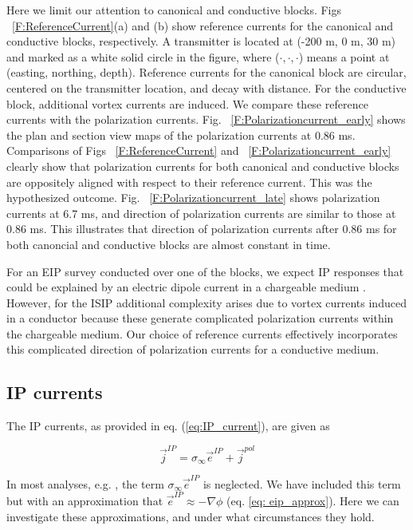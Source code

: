 \documentclass[extra,mreferee]{gji}
\newcommand{\siginf}{\sigma_\infty}
\renewcommand {\j}  { {\vec j} }
\newcommand {\e}  { {\vec e} }
\begin{document}
Here we limit our attention to canonical and conductive blocks. 
Figs ~\ref{F:ReferenceCurrent}(a)   and (b) show reference currents for the canonical and conductive blocks, respectively. 
A transmitter is located at (-200 m, 0 m, 30 m) and marked as a white solid circle in the figure, where ($\cdot, \cdot, \cdot$) means a point at (easting, northing, depth).
Reference currents for the canonical block are circular, centered on the transmitter location, and decay with distance. 
For the conductive block, additional vortex currents are induced.
We compare these reference currents with the polarization currents. 
Fig. ~\ref{F:Polarizationcurrent_early} shows the plan and section view maps of the polarization currents at 0.86 ms.
Comparisons of Figs ~\ref{F:ReferenceCurrent} and ~\ref{F:Polarizationcurrent_early} clearly show that polarization currents for both canonical and conductive blocks are oppositely aligned with respect to their reference current. This was the hypothesized outcome.
Fig. ~\ref{F:Polarizationcurrent_late} shows polarization currents at 6.7 ms, and direction of polarization currents are similar to those at 0.86 ms. 
This illustrates that direction of polarization currents after 0.86 ms for both canoncial and conductive blocks are almost constant in time. 

For an EIP survey conducted over one of the blocks, we expect  IP responses that could be explained by an electric dipole current in a chargeable medium \cite[]{seigel1959}. 
However, for the ISIP additional complexity arises due to vortex currents induced in a conductor because these generate complicated polarization currents within the chargeable medium. 
Our choice of reference currents effectively incorporates this complicated direction of polarization currents for a conductive medium. 

\subsection{IP currents}
The IP currents, as provided in eq. (\ref{eq:IP_current}), are given as 
\begin{linenomath*}
\begin{equation}
  \j^{IP}=\siginf  \e^{IP} + \j^{pol}
\end{equation}
\end{linenomath*}

In most analyses, e.g. \cite{Smith1988a}, the term $\siginf \e^{IP}$ is neglected. We have included this term but with an approximation that $\e^{IP} \approx -\nabla \phi$  (eq. \ref{eq: eip_approx}). Here we can investigate these approximations, and under what circumstances they hold. 
\end{document}
